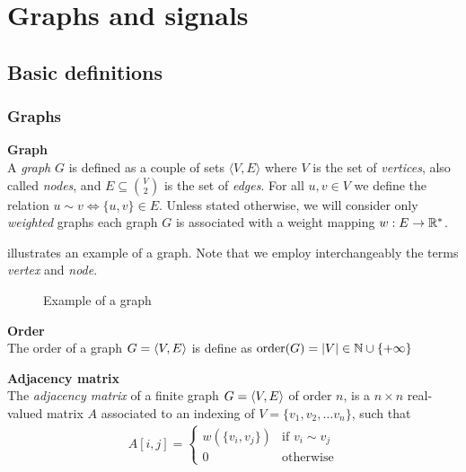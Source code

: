 \section{Graphs and signals}

\subsection{Basic definitions}

\subsubsection{Graphs}

\begin{definition}\textbf{Graph}\\
A \emph{graph} $G$ is defined as a couple of sets $\langle V,E \rangle$ where $V$ is the set of \emph{vertices}, also called \emph{nodes}, and $E \subseteq\binom{V}{2}$ is the set of \emph{edges}. For all $u, v \in V$ we define the relation $u \sim v \Leftrightarrow \{u,v\} \in E$. Unless stated otherwise, we will consider only \emph{weighted} graphs \ie each graph $G$ is associated with a weight mapping $w: E \rightarrow \mathbb{R}^*$.
\end{definition}

 illustrates an example of a graph. Note that we employ interchangeably the terms \emph{vertex} and \emph{node}.

\begin{figure}[H]
\centering
{}
\caption{Example of a graph}
\label{fig:graph}
\end{figure}

\begin{definition}\textbf{Order}\\
The order of a graph $G = \langle V, E \rangle$ is define as $\operatorname{order}(G) = |V| \in \mathbb{N} \cup \{+\infty\}$
\end{definition}

\begin{definition}\textbf{Adjacency matrix}\\
The \emph{adjacency matrix} of a finite graph $G = \langle V, E \rangle$ of order $n$, is a $n \times n$ real-valued matrix $A$ associated to an indexing of $V = \{v_1, v_2, \ldots v_n\}$, such that
\begin{gather*}
A[i,j] =
 \begin{cases}
   w\left(\{v_i, v_j\}\right) & \text{if } v_i \sim v_j \\
   0 & \text{otherwise}
 \end{cases}
\end{gather*}
 \end{definition}

